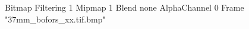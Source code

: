 {Bitmap
	{Filtering 1}
	{Mipmap 1}
	{Blend none}
	{AlphaChannel 0}
	{Frame "37mm_bofors_xx.tif.bmp"}
}
